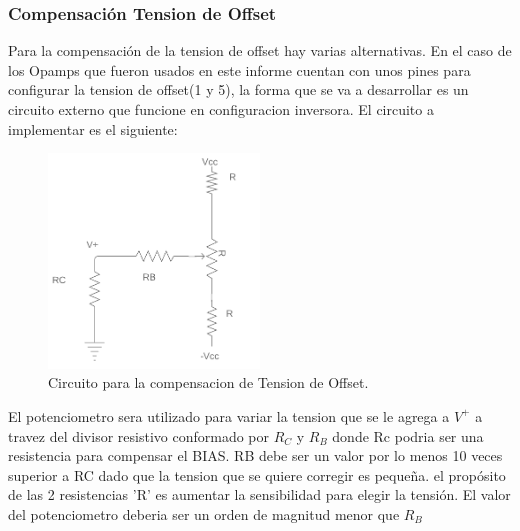 \subsubsection{Compensación Tension de Offset}
Para la compensación de la tension de offset hay varias alternativas. En el caso de los Opamps que fueron usados en este informe cuentan con unos pines para configurar la tension de offset(1 y 5), la forma que se va a desarrollar es un circuito externo que funcione en configuracion inversora.
El circuito a implementar es el siguiente:
\begin{figure}[H]	
	\centering
	\includegraphics[width=0.5\textwidth]{Ejercicio3/imagenes/CompensacionOff.PNG}
	\caption{Circuito para la compensacion de Tension de Offset.}
	\label{fig:CompensacionOff}
\end{figure}
El potenciometro sera utilizado para variar la tension que se le agrega a $V^+$ a travez del divisor resistivo conformado por $R_C$ y $R_B$ donde Rc podria ser una resistencia para compensar el BIAS. RB debe ser un valor por lo menos 10 veces superior a RC dado que la tension que se quiere corregir es pequeña. el propósito de las 2 resistencias 'R' es aumentar la sensibilidad para elegir la tensión. El valor del potenciometro deberia ser un orden de magnitud menor que $R_B $

